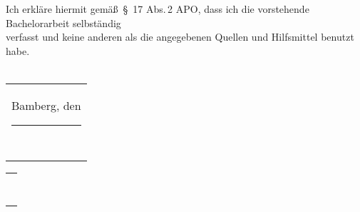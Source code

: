 \documentclass[
	11pt,
	german,
	singlespacing,
	parskip,
	nohyperref,
	consistentlayout,
]{PsiThesis}
\newcommand{\thesistype}{Bachelor}
\begin{document}
	\graphicspath{{./figures/}{./examples/}}

	
	
	
	
	
	

	\appendix
	\renewcommand{\thesection}{\thechapter.\arabic{section}}
	\renewcommand{\thesubsection}{\thesection.\arabic{subsection}}
	\renewcommand{\thesubsubsection}{\thesubsection.\arabic{subsubsection}}

	
	


	\setlength\columnsep{2em}
	\begin{multicols}{2}
		\begin{refcontext}[sorting=nyt]
			\renewcommand*{\bibfont}{\small\RaggedRight}
			\linespread{1.0}\selectfont
			\printbibliography[heading=none]
		\end{refcontext}
	\end{multicols}

	\begin{declaration}
		\addchaptertocentry{\authorshipname}
		Ich erkläre hiermit gemä\ss\ \S~17 Abs.\,2 APO, dass ich die vorstehende {\thesistype}arbeit selbständig\\ verfasst und keine anderen als die angegebenen Quellen und Hilfsmittel benutzt habe.\\
		\bigskip
		\bigskip
		\\
		\begin{tabular}{@{}l@{}}
  		Bamberg, den \rule[-0.8em]{10em}{0.5pt}\\[2ex]
  		~
		\end{tabular}
		\hspace{\fill}%
		\begin{tabular}{@{}c@{}}
  			\rule[-0.8em]{20em}{0.5pt}\\[2ex]
  			\authorname
			\end{tabular}\hspace{\fill}
	\end{declaration}
\end{document}
